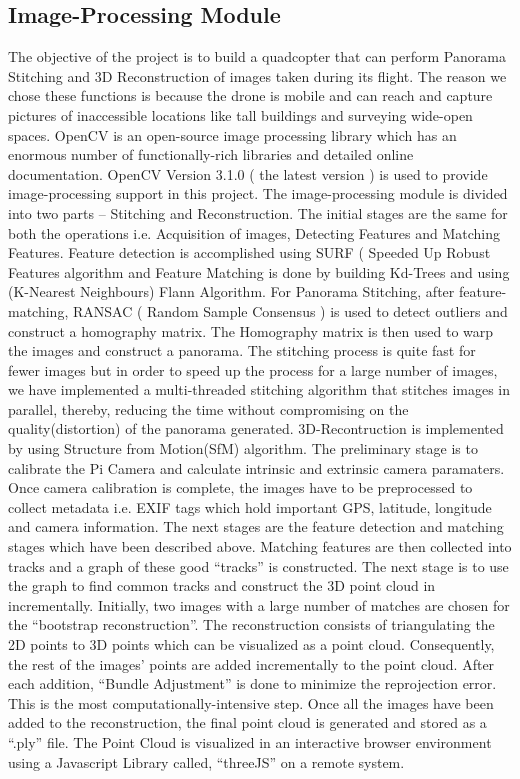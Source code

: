 \subsection{Image-Processing Module}
The objective of the project is to build a quadcopter that can perform Panorama Stitching and 3D Reconstruction of images taken during its flight. The reason we chose these functions is because the drone is mobile and can reach and capture pictures of inaccessible locations like tall buildings and surveying wide-open spaces. OpenCV is an open-source image processing library which has an enormous number of functionally-rich libraries and detailed online documentation. OpenCV  Version 3.1.0 ( the latest version ) is used to provide image-processing support in this project.
The image-processing module is divided into two parts – Stitching and Reconstruction. The initial stages are the same for both the operations i.e. Acquisition of images, Detecting Features and Matching Features.  Feature detection is accomplished using SURF ( Speeded Up Robust Features  algorithm and Feature Matching is done by building Kd-Trees and using (K-Nearest Neighbours) Flann Algorithm.
For Panorama Stitching, after feature-matching, RANSAC ( Random Sample Consensus ) is used to detect outliers and construct a homography matrix. The Homography matrix is then used to warp the images and construct a panorama. The stitching process is quite fast for fewer images but in order to speed up the process for a large number of images, we have implemented a multi-threaded stitching algorithm that stitches images in parallel, thereby, reducing the time without compromising on the quality(distortion) of the panorama generated.
 3D-Recontruction is implemented by using Structure from Motion(SfM) algorithm. The preliminary stage is to calibrate the Pi Camera and calculate intrinsic and extrinsic camera paramaters. Once camera calibration is complete, the images have to be preprocessed to collect metadata i.e. EXIF tags which hold important GPS, latitude, longitude and camera information. The next stages are the feature detection and matching stages which have been described above. Matching features are then collected into tracks and a graph of these good “tracks” is constructed. The next stage is to use the graph to find common tracks and construct the 3D point cloud in incrementally. Initially, two images with a large number of matches are chosen for the “bootstrap reconstruction”. The reconstruction consists of triangulating the 2D points to 3D points which can be visualized as a point cloud. Consequently, the rest of the images' points are added incrementally to the point cloud. After each addition, “Bundle Adjustment” is done to minimize the reprojection error. This is the most computationally-intensive step. Once all the images have been added to the reconstruction, the final point cloud is generated and stored as a “.ply” file. The Point Cloud is visualized in an interactive browser environment using a Javascript Library called, “threeJS” on a remote system.   

